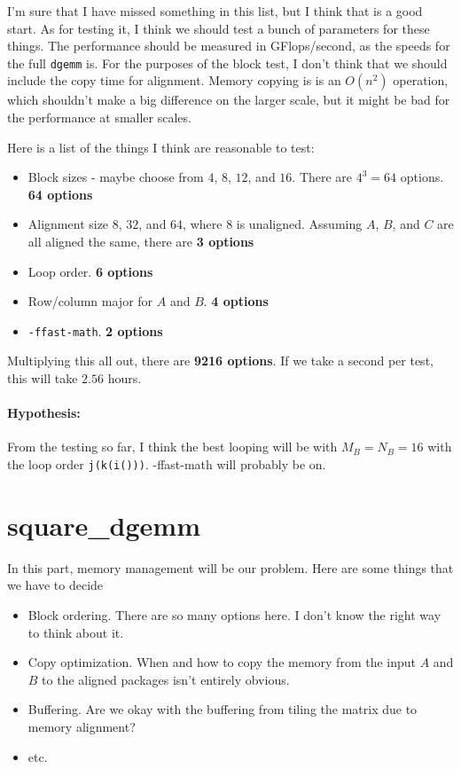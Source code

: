 \documentclass{article}
\begin{document}
I'm sure that I have missed something in this list, but I think that is a good start. As for testing it, I think we should test a bunch of parameters for these things. The performance should be measured in GFlops/second, as the speeds for the full \texttt{dgemm} is. For the purposes of the block test, I don't think that we should include the copy time for alignment. Memory copying is is an $O(n^2)$ operation, which shouldn't make a big difference on the larger scale, but it might be bad for the performance at smaller scales.

Here is a list of the things I think are reasonable to test:
\begin{itemize}
	\item Block sizes - maybe choose from $4$, $8$, $12$, and $16$. There are $4^3 = 64$ options. \textbf{64 options}
	\item Alignment size $8$, $32$, and $64$, where $8$ is unaligned. Assuming $A$, $B$, and $C$ are all aligned the same, there are \textbf{3 options}
	\item Loop order. \textbf{6 options}
	\item Row/column major for $A$ and $B$. \textbf{4 options}
	\item \texttt{-ffast-math}. \textbf{2 options}
\end{itemize}
Multiplying this all out, there are \textbf{9216 options}. If we take a second per test, this will take $2.56$ hours. 

\paragraph{Hypothesis:} From the testing so far, I think the best looping will be with $M_B = N_B = 16$ with the loop order \texttt{j(k(i()))}. -ffast-math will probably be on.

\section{square\_dgemm}
In this part, memory management will be our problem. Here are some things that we have to decide
\begin{itemize}
	\item Block ordering. There are so many options here. I don't know the right way to think about it.
	\item Copy optimization. When and how to copy the memory from the input $A$ and $B$ to the aligned packages isn't entirely obvious.
	\item Buffering. Are we okay with the buffering from tiling the matrix due to memory alignment?
	\item etc.
\end{itemize}
\end{document}
